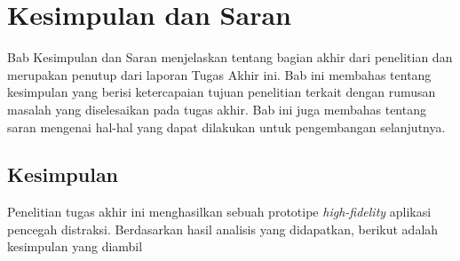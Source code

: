 \chapter{Kesimpulan dan Saran}

Bab Kesimpulan dan Saran menjelaskan tentang bagian akhir dari penelitian dan merupakan penutup dari laporan Tugas Akhir ini. Bab ini membahas tentang kesimpulan yang berisi ketercapaian tujuan penelitian terkait dengan rumusan masalah yang diselesaikan pada tugas akhir. Bab ini juga membahas tentang saran mengenai hal-hal yang dapat dilakukan untuk pengembangan selanjutnya.

\section{Kesimpulan}
Penelitian tugas akhir ini menghasilkan sebuah prototipe \textit{high-fidelity} aplikasi pencegah distraksi. Berdasarkan hasil analisis yang didapatkan, berikut adalah kesimpulan yang diambil

